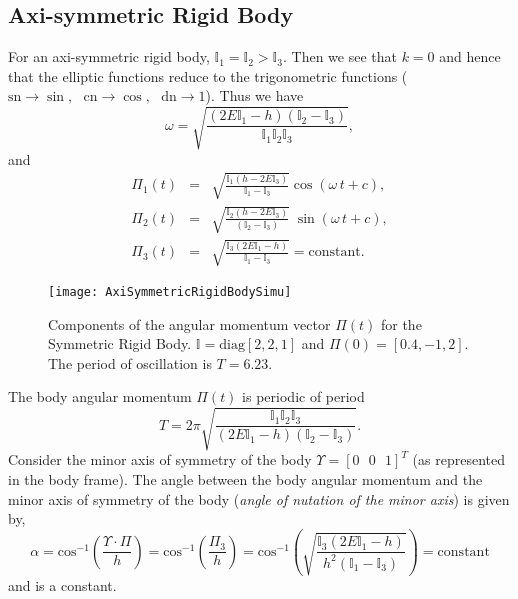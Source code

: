 \documentclass[graybox,envcountchap,sectrefs]{svmonoMuga}
\begin{document}
\subsection{Axi-symmetric Rigid Body}\label{Secn:AxiSymRigidBody}
For an axi-symmetric rigid body, $\mathbb{I}_1=\mathbb{I}_2>\mathbb{I}_3$. Then we see that $k=0$ and hence that the elliptic functions reduce to the trigonometric functions ($\mathrm{sn}\rightarrow \sin, \:\:\:\mathrm{cn}\rightarrow \cos,\:\:\: \mathrm{dn}\rightarrow 
1$). Thus we have
\[
\omega=\sqrt{\frac{(2E\mathbb{I}_1-h)(\mathbb{I}_2-\mathbb{I}_3)}{\mathbb{I}_1\mathbb{I}_2\mathbb{I}_3}},
\]
and
\begin{eqnarray}
\Pi_1(t) &=&\sqrt{\frac{\mathbb{I}_1(h-2E\mathbb{I}_3)}{\mathbb{I}_1-\mathbb{I}_3}}\cos(\omega\, t +c), \label{eq:Pi1_AxiSym}\\
\Pi_2(t) &=&\sqrt{\frac{\mathbb{I}_2(h-2E\mathbb{I}_3)}{(\mathbb{I}_2-\mathbb{I}_3)}}\;\sin(\omega\, t +c),\label{eq:Pi2_AxiSym}\\
\Pi_3(t) &=&\sqrt{\frac{\mathbb{I}_3(2E\mathbb{I}_1-h)}{\mathbb{I}_1-\mathbb{I}_3}}=\mathrm{constant}.\label{eq:Pi3_AxiSym}
\end{eqnarray}
\begin{figure}[ht]
\begin{center}
\texttt{[image: AxiSymmetricRigidBodySimu]}
\renewcommand{\baselinestretch}{1}\selectfont
\caption{Components of the angular momentum vector $\Pi (t)$ for the Symmetric Rigid Body. $\mathbb{I}=\mathrm{diag}[2,2,1]$ and $\Pi(0)=[0.4,-1,2]$. The period of oscillation is $T=6.23$.}
\label{Fig:AxiSymmetricRigidBodySimu}
\renewcommand{\baselinestretch}{1.5}\selectfont
\end{center}
\end{figure}
The body angular momentum $\Pi(t)$ is periodic of period
\[
T=2\pi \sqrt{\frac{\mathbb{I}_1\mathbb{I}_2\mathbb{I}_3}{(2E\mathbb{I}_1-h)(\mathbb{I}_2-\mathbb{I}_3)}}.
\]
Consider the minor axis of symmetry of the body $\Upsilon=[0\:\:\:0\:\:\:1]^T$ (as represented in the body frame).
The angle between the body angular momentum and the minor axis of symmetry of the body (\textit{angle of nutation of the minor axis}) is given by,
\[
\alpha=\mathrm{cos}^{-1}\left(\frac{\Upsilon \cdot \Pi}{h}\right)=\mathrm{cos}^{-1}\left(\frac{\Pi_3}{h}\right)
=\mathrm{cos}^{-1}\left(\sqrt{\frac{\mathbb{I}_3(2E\mathbb{I}_1-h)}{h^2(\mathbb{I}_1-\mathbb{I}_3)}}\right)=\mathrm{constant}
\]
and is a constant.
\end{document}
